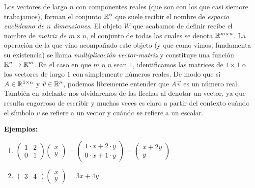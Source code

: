 \begin{tcolorbox}[title={Definiciones (Espacio $\R^n$, matriz, multiplicación vector-matriz)}]
    Los vectores de largo $n$ con componentes reales (que son con los que casi siemore trabajamos), forman el conjunto $\R^n$ que suele recibir el nombre de \textit{espacio euclideano de $n$ dimensiones}. El objeto $W$ que acabamos de definir recibe el nombre de \textit{matriz de $m \times n$}, el conjunto de todas las cuales se denota $\mathbb{R}^{m \times n}$. La operación de la que vino acompañado este objeto (y que como vimos, fundamenta su existencia) se llama \textit{multiplicación vector-matriz} y constituye una función $\mathbb{R}^n \to \mathbb{R}^m$. En el caso en que $m$ o $n$ sean $1$, identificamos las matrices de $1 \times 1$ o los vectores de largo $1$ con simplemente números reales. De modo que si $A \in \mathbb{R}^{1 \times n}$ y $\vec{v} \in \mathbb{R}^n$, podemos libremente entender que $A\vec{v}$ es un número real. También en adelante nos olvidaremos de las flechas al denotar un vector, ya que resulta engorroso de escribir y muchas veces es claro a partir del contexto cuándo el símbolo $v$ se refiere a un vector y cuándo se refiere a un escalar.
\end{tcolorbox}

\textbf{Ejemplos:}

\begin{enumerate}
    \item $\begin{pmatrix}
        1 & 2 \\ 0 & 1
    \end{pmatrix} \begin{pmatrix}
        x \\ y
    \end{pmatrix} = \begin{pmatrix} 1 \cdot x + 2 \cdot y \\ 0 \cdot x + 1 \cdot y \end{pmatrix} = \begin{pmatrix}
        x + 2y \\ y
    \end{pmatrix}$
    \item $\begin{pmatrix}
        3 & 4
    \end{pmatrix} \begin{pmatrix}
        x \\ y
    \end{pmatrix} = 3x + 4y$
\end{enumerate}

